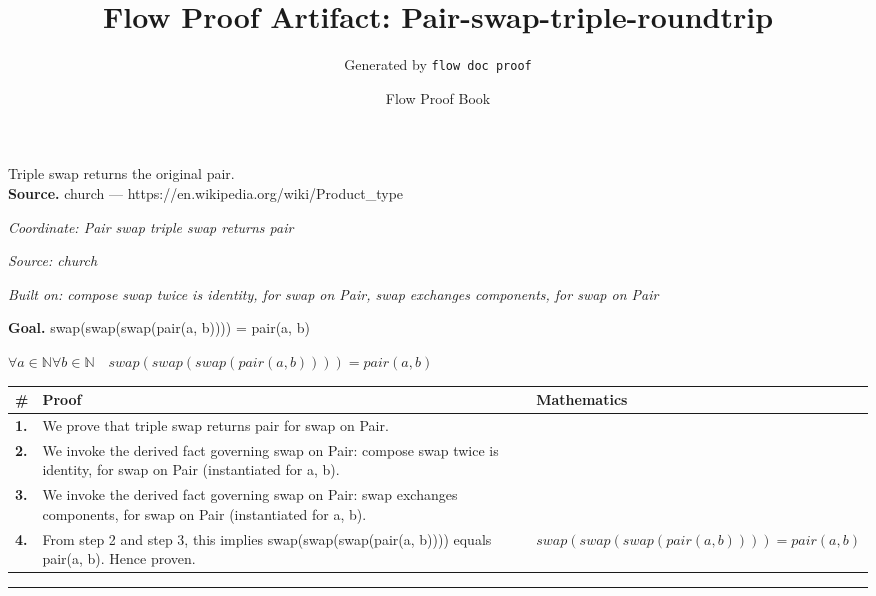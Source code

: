 \documentclass[11pt]{article}
\title{Flow Proof Artifact: Pair-swap-triple-roundtrip}
\author{Generated by \texttt{flow doc proof}}
\date{Flow Proof Book}
\theoremstyle{definition}
\begin{document}
\maketitle
Triple swap returns the original pair.\\[0.5em]
\textbf{Source.} church — https://en.wikipedia.org/wiki/Product\_type\\[0.5em]
\bigskip
{}\par
\smallskip\noindent\textit{Coordinate: Pair \cdot swap \cdot triple swap returns pair}\par
\smallskip\noindent\textit{Source: church}\par
\smallskip\noindent\textit{Built on: compose swap twice is identity, for swap on Pair, swap exchanges components, for swap on Pair}\par
\medskip
\noindent\textbf{Goal.} swap(swap(swap(pair(a, b)))) = pair(a, b)\par
\noindent$\displaystyle \forall a \in \mathbb{N} \forall b \in \mathbb{N}\quad swap(swap(swap(pair(a, b)))) = pair(a, b)$\par
\medskip
\noindent
\begin{tabular}{@{} >{\raggedright\arraybackslash}p{} >{\raggedright\arraybackslash}p{} >{\raggedleft\arraybackslash}p{} @{}}
\textbf{\#} & \textbf{Proof} & \textbf{Mathematics} \\
\midrule
\textbf{1.} & We prove that triple swap returns pair for swap on Pair. & \\[0.45em]
\textbf{2.} & We invoke the derived fact governing swap on Pair: compose swap twice is identity, for swap on Pair (instantiated for a, b). & \\[0.45em]
\textbf{3.} & We invoke the derived fact governing swap on Pair: swap exchanges components, for swap on Pair (instantiated for a, b). & \\[0.45em]
\textbf{4.} & From step 2 and step 3, this implies swap(swap(swap(pair(a, b)))) equals pair(a, b). Hence proven. & $\displaystyle swap(swap(swap(pair(a, b)))) = pair(a, b)$ \\[0.45em]
\bottomrule
\end{tabular}
\label{thm:Pair-swap-triple_swap_returns_pair}
\par\medskip\hrule
\end{document}
